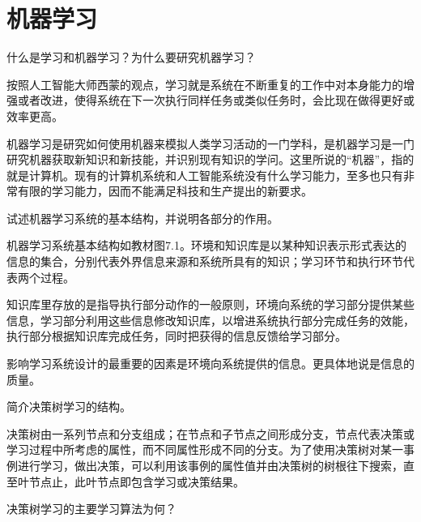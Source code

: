 \chapter{机器学习}

\begin{question}
什么是学习和机器学习？为什么要研究机器学习？
\end{question}
\begin{solution}
按照人工智能大师西蒙的观点，学习就是系统在不断重复的工作中对本身能力的增强或者改进，使得系统在下一次执行同样任务或类似任务时，会比现在做得更好或效率更高。\par
机器学习是研究如何使用机器来模拟人类学习活动的一门学科，是机器学习是一门研究机器获取新知识和新技能，并识别现有知识的学问。这里所说的“机器”，指的就是计算机。现有的计算机系统和人工智能系统没有什么学习能力，至多也只有非常有限的学习能力，因而不能满足科技和生产提出的新要求。 
\end{solution}

\begin{question}
试述机器学习系统的基本结构，并说明各部分的作用。
\end{question}
\begin{solution}
机器学习系统基本结构如教材图7.1。环境和知识库是以某种知识表示形式表达的信息的集合，分别代表外界信息来源和系统所具有的知识；学习环节和执行环节代表两个过程。\par
知识库里存放的是指导执行部分动作的一般原则，环境向系统的学习部分提供某些信息，学习部分利用这些信息修改知识库，以增进系统执行部分完成任务的效能，执行部分根据知识库完成任务，同时把获得的信息反馈给学习部分。\par
影响学习系统设计的最重要的因素是环境向系统提供的信息。更具体地说是信息的质量。 
\end{solution}

\begin{question}
简介决策树学习的结构。
\end{question}
\begin{solution}
决策树由一系列节点和分支组成；在节点和子节点之间形成分支，节点代表决策或学习过程中所考虑的属性，而不同属性形成不同的分支。为了使用决策树对某一事例进行学习，做出决策，可以利用该事例的属性值并由决策树的树根往下搜索，直至叶节点止，此叶节点即包含学习或决策结果。
\end{solution}

\begin{question}
决策树学习的主要学习算法为何？
\end{question}
\begin{solution}
\end{solution}

